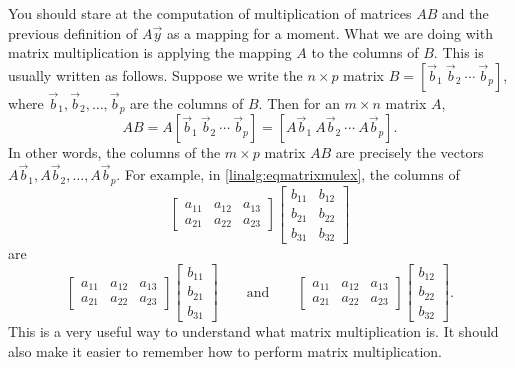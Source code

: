 You should stare at the computation of multiplication of matrices $AB$
and
the previous definition of $A\vec{y}$ as a mapping
for a moment.
What we are doing with matrix multiplication is applying
the mapping $A$ to the columns of $B$.  This is usually written as follows.
Suppose we write the $n \times p$ matrix
$B = [ \vec{b}_1 ~ \vec{b}_2 ~ \cdots ~ \vec{b}_p ]$, where
$\vec{b}_1, \vec{b}_2, \ldots, \vec{b}_p$ are the columns of $B$.  Then
for an $m \times n$ matrix $A$,
\begin{equation*}
AB = 
A [ \vec{b}_1 ~ \vec{b}_2 ~ \cdots ~ \vec{b}_p ]
=
[ A\vec{b}_1 ~ A\vec{b}_2 ~ \cdots ~ A\vec{b}_p ] .
\end{equation*}
In other words, the columns of the $m \times p$ matrix $AB$
are precisely the
vectors $A\vec{b}_1, A\vec{b}_2, \ldots, A\vec{b}_p$.
For example, in \eqref{linalg:eqmatrixmulex},
the columns of 
\begin{equation*}
\begin{bmatrix}
a_{11} & a_{12} & a_{13} \\
a_{21} & a_{22} & a_{23}
\end{bmatrix}
\begin{bmatrix}
b_{11} & b_{12} \\
b_{21} & b_{22} \\
b_{31} & b_{32}
\end{bmatrix}
\end{equation*}
are
\begin{equation*}
\begin{bmatrix}
a_{11} & a_{12} & a_{13} \\
a_{21} & a_{22} & a_{23}
\end{bmatrix}
\begin{bmatrix}
b_{11} \\
b_{21} \\
b_{31}
\end{bmatrix}
\qquad
\text{and}
\qquad
\begin{bmatrix}
a_{11} & a_{12} & a_{13} \\
a_{21} & a_{22} & a_{23}
\end{bmatrix}
\begin{bmatrix}
b_{12} \\
b_{22} \\
b_{32}
\end{bmatrix} .
\end{equation*}
This is a very useful way to understand what matrix multiplication is.
It should also make it easier to remember how to perform matrix multiplication.


